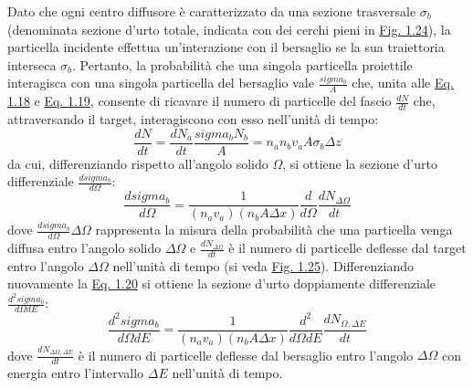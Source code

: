 \documentclass[12pt,a4paper,twoside]{report}
\begin{document}
	Dato che ogni centro diffusore è caratterizzato da una sezione trasversale $\sigma_b$ (denominata sezione d'urto totale, indicata con dei cerchi pieni in \hyperref[fig:scattering]{Fig. 1.24}), la particella incidente effettua un'interazione con il bersaglio se la sua traiettoria interseca $\sigma_b$. Pertanto, la probabilità che una singola particella proiettile interagisca con una singola particella del bersaglio vale $\frac{sigma_b}{A}$ che, unita alle \hyperref[eq:scattering1]{Eq. 1.18} e \hyperref[eq:scattering2]{Eq. 1.19}, consente di ricavare il numero di particelle del fascio $\frac{dN}{dt}$ che, attraversando il target, interagiscono con esso nell'unità di tempo:
	\begin{equation}
		\frac{dN}{dt}=\frac{dN_a}{dt}\frac{sigma_bN_b}{A}=n_an_bv_aA\sigma_b\Delta z
		\label{eq:scattering3}
	\end{equation}
	da cui, differenziando rispetto all'angolo solido $\Omega$, si ottiene la sezione d'urto differenziale $\frac{dsigma_b}{d\Omega}$:
	\begin{equation}
		\frac{dsigma_b}{d\Omega}=\frac{1}{\left(n_av_a\right)\left(n_bA\Delta x\right)}\frac{d}{d\Omega}\frac{dN_{\Delta\Omega}}{dt}
		\label{eq:scattering4}
	\end{equation}
	dove $\frac{dsigma_b}{d\Omega}\Delta \Omega$ rappresenta la misura della probabilità che una particella venga diffusa entro l'angolo solido $\Delta \Omega$ e $\frac{dN_{\Delta\Omega}}{dt}$ è il numero di particelle deflesse dal target entro l'angolo $\Delta \Omega$ nell'unità di tempo (si veda \hyperref[fig:solid_angle]{Fig. 1.25}). Differenziando nuovamente la \hyperref[eq:scattering2]{Eq. 1.20} si ottiene la sezione d'urto doppiamente differenziale $\frac{d^2sigma_b}{d\Omega dE}$:
	\begin{equation}
		\frac{d^2sigma_b}{d\Omega dE}=\frac{1}{\left(n_av_a\right)\left(n_bA\Delta x\right)}\frac{d^2}{d\Omega dE}\frac{dN_{\Omega,\Delta E}}{dt}
		\label{eq:scattering5}
	\end{equation}
	dove $\frac{dN_{\Delta\Omega,\Delta E}}{dt}$ è il numero di particelle deflesse dal bersaglio entro l'angolo $\Delta \Omega$ con energia entro l'intervallo $\Delta E$ nell'unità di tempo.
	
\end{document}
